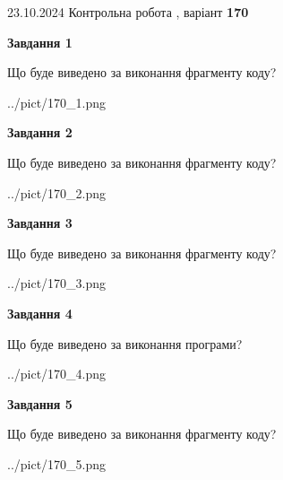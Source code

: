 \documentclass[12pt, ukrainian]{article}
\begin{document}
{\Large{23.10.2024 Контрольна робота , варіант  \No \textbf { 170 }\par}}
{
\begin {large}
{\begin {center}\textbf{Завдання 1}\end {center}}

Що буде виведено за виконання фрагменту коду?\par
\begin{center}
	{../pict/170_1.png}
\end{center}
\newpage

{\begin {center}\textbf{Завдання 2}\end {center}}

Що буде виведено за виконання фрагменту коду?\par
\begin{center}
	{../pict/170_2.png}
\end{center}
\newpage

{\begin {center}\textbf{Завдання 3}\end {center}}

Що буде виведено за виконання фрагменту коду?\par
\begin{center}
	{../pict/170_3.png}
\end{center}
\newpage

{\begin {center}\textbf{Завдання 4}\end {center}}

Що буде виведено за виконання програми?\par
\begin{center}
	{../pict/170_4.png}
\end{center}
\newpage

{\begin {center}\textbf{Завдання 5}\end {center}}

Що буде виведено за виконання фрагменту коду?\par
\begin{center}
	{../pict/170_5.png}
\end{center}
\newpage


\end{large}}
\end{document}
